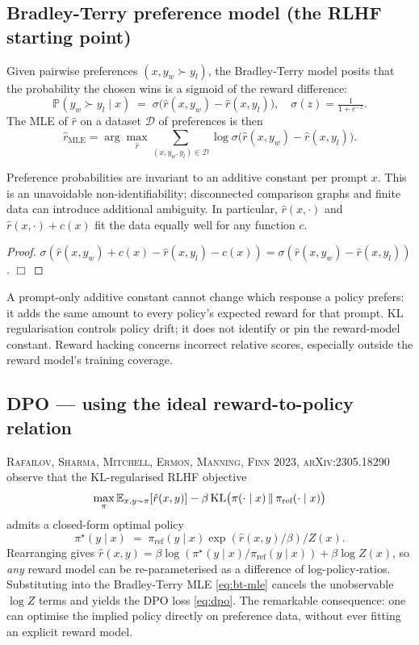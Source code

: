 \documentclass[11pt,oneside]{scrbook}
\begin{document}
\subsection*{Bradley-Terry preference model (the RLHF starting point)}

Given pairwise preferences $(x, y_w \succ y_l)$, the Bradley-Terry model
posits that the probability the chosen wins is a sigmoid of the reward
difference:
\[
  \mathbb{P}(y_w \succ y_l \mid x) \;=\; \sigma\big(\hat r(x, y_w) - \hat r(x, y_l)\big),
  \quad \sigma(z) = \tfrac{1}{1 + e^{-z}}.
\]
The MLE of $\hat r$ on a dataset $\mathcal{D}$ of preferences is then
\begin{equation}\label{eq:bt-mle}
  \hat r_\text{MLE} = \arg\max_{\hat r} \sum_{(x, y_w, y_l) \in \mathcal{D}} \log \sigma\big(\hat r(x, y_w) - \hat r(x, y_l)\big).
\end{equation}

\begin{theorem}
Preference probabilities are invariant to an additive constant per prompt
$x$. This is an unavoidable non-identifiability; disconnected comparison
graphs and finite data can introduce additional ambiguity. In particular, $\hat r(x, \cdot)$ and $\hat r(x, \cdot) + c(x)$
fit the data equally well for any function $c$.
\end{theorem}

\begin{proof}
$\sigma(\hat r(x, y_w) + c(x) - \hat r(x, y_l) - c(x)) = \sigma(\hat r(x, y_w) - \hat r(x, y_l))$. $\Box$
\end{proof}

\begin{intuition}
A prompt-only additive constant cannot change which response a policy
prefers: it adds the same amount to every policy's expected reward for
that prompt. KL regularisation controls policy drift; it does not identify
or pin the reward-model constant. Reward hacking concerns incorrect
relative scores, especially outside the reward model's training coverage.
\end{intuition}

\subsection*{DPO --- using the ideal reward-to-policy relation}

\textsc{Rafailov, Sharma, Mitchell, Ermon, Manning, Finn 2023, arXiv:2305.18290}
observe that the KL-regularised RLHF objective
\[
  \max_\pi \mathbb{E}_{x, y \sim \pi}[\hat r(x, y)] - \beta\, \mathrm{KL}\big(\pi(\cdot \mid x) \,\|\, \pi_\text{ref}(\cdot \mid x)\big)
\]
admits a closed-form optimal policy
\[
  \pi^\star(y \mid x) \;=\; \pi_\text{ref}(y \mid x) \exp(\hat r(x, y) / \beta) / Z(x).
\]
Rearranging gives $\hat r(x, y) = \beta \log(\pi^\star(y\mid x)/\pi_\text{ref}(y \mid x)) + \beta \log Z(x)$, so
\emph{any} reward model can be re-parameterised as a difference of
log-policy-ratios. Substituting into the Bradley-Terry MLE
\eqref{eq:bt-mle} cancels the unobservable $\log Z$ terms and yields
the DPO loss \eqref{eq:dpo}. The remarkable consequence: one can
optimise the implied policy directly on preference data, without
ever fitting an explicit reward model.
\end{document}
